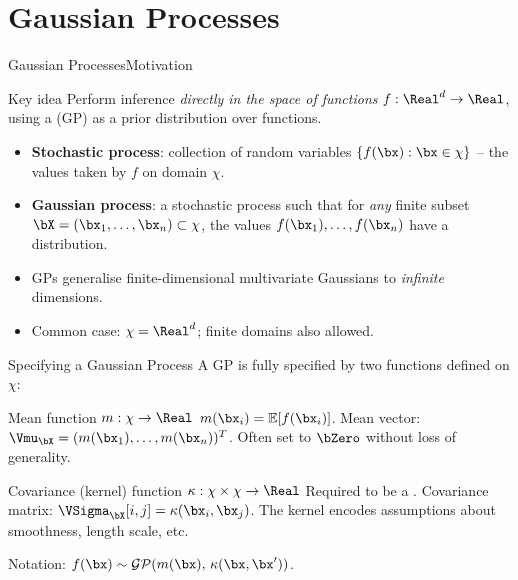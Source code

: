\section{Gaussian Processes}

\begin{frame}{Gaussian Processes}{Motivation}
  \begin{block}{Key idea}
    Perform inference \emph{directly in the space of functions}
    $f:\Real^d\to\Real$, using a  (GP)
    as a prior distribution over functions.
  \end{block}

  \medskip
  \begin{itemize}
    \item \textbf{Stochastic process}: collection of random variables
          $\{f(\bx):\bx\in\chi\}$ -- the values taken by $f$ on domain $\chi$.
    \item \textbf{Gaussian process}: a stochastic process such that for \emph{any} finite
          subset $\bX=(\bx_1,\ldots,\bx_n)\subset\chi$, the values
          $f(\bx_1),\ldots,f(\bx_n)$ have a  distribution.
    \item GPs generalise finite-dimensional multivariate Gaussians to \emph{infinite} dimensions.
    \item Common case: $\chi=\Real^d$; finite domains also allowed.
  \end{itemize}
\end{frame}

\begin{frame}{Specifying a Gaussian Process}{}
  A GP is fully specified by two functions defined on $\chi$:

  \medskip
  \begin{block}{Mean function $m:\chi\to\Real$}
    $m(\bx_i)=\mathbb{E}[f(\bx_i)]$.
    Mean vector: $\Vmu_{\bX}=(m(\bx_1),\ldots,m(\bx_n))^T$.
    Often set to $\bZero$ without loss of generality.
  \end{block}

  \medskip
  \begin{block}{Covariance (kernel) function $\kappa:\chi\times\chi\to\Real$}
    Required to be a .
    Covariance matrix: $\VSigma_{\bX}[i,j]=\kappa(\bx_i,\bx_j)$.
    The kernel encodes assumptions about smoothness, length scale, etc.
  \end{block}

  \medskip
  Notation: $f(\bx)\sim\mathcal{GP}(m(\bx),\,\kappa(\bx,\bx'))$.
\end{frame}

